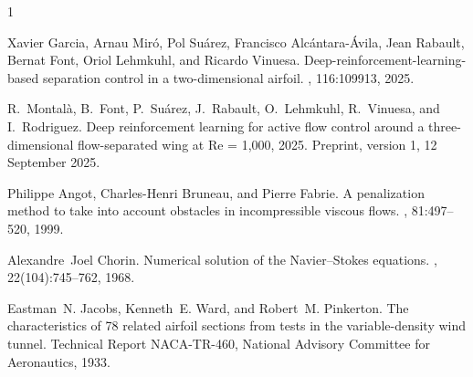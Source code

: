 \begin{thebibliography}{1}

Xavier Garcia, Arnau Mir{\'o}, Pol Su{\'a}rez, Francisco
  Alc{\'a}ntara-{\'A}vila, Jean Rabault, Bernat Font, Oriol Lehmkuhl, and
  Ricardo Vinuesa.
\newblock Deep-reinforcement-learning-based separation control in a
  two-dimensional airfoil.
, 116:109913, 2025.

R.~Montal{\`a}, B.~Font, P.~Su{\'a}rez, J.~Rabault, O.~Lehmkuhl, R.~Vinuesa,
  and I.~Rodriguez.
\newblock Deep reinforcement learning for active flow control around a
  three-dimensional flow-separated wing at {Re = 1,000}, 2025.
\newblock Preprint, version 1, 12 September 2025.

Philippe Angot, Charles-Henri Bruneau, and Pierre Fabrie.
\newblock A penalization method to take into account obstacles in
  incompressible viscous flows.
, 81:497--520, 1999.

Alexandre~Joel Chorin.
\newblock Numerical solution of the {Navier--Stokes} equations.
, 22(104):745--762, 1968.

Eastman~N. Jacobs, Kenneth~E. Ward, and Robert~M. Pinkerton.
\newblock The characteristics of 78 related airfoil sections from tests in the
  variable-density wind tunnel.
\newblock Technical Report NACA-TR-460, National Advisory Committee for
  Aeronautics, 1933.

\end{thebibliography}
